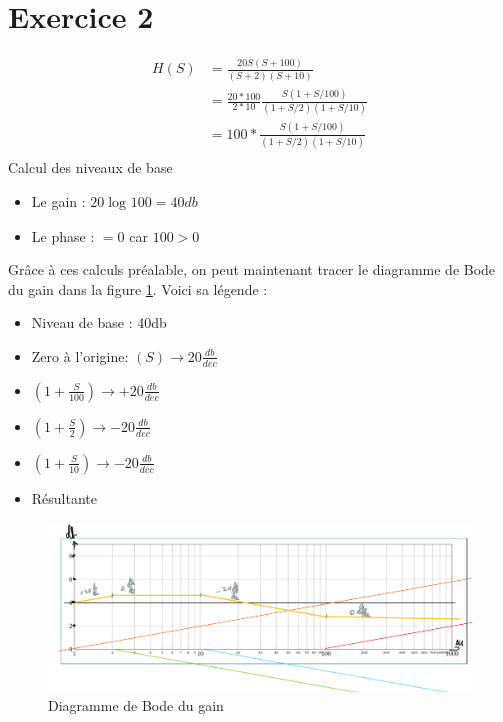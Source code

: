 \documentclass{article}
\theoremstyle{plain}%
\theoremstyle{definition}
\theoremstyle{remark}
\begin{document}
\section{Exercice 2}
\begin{align*}
    H(S) &= \frac{20S(S+100)}{(S+2)(S+10)} \\
        &= \frac{20*100}{2*10} \frac{S(1 + S/100)}{(1+S/2)(1+S/10)} \\
        &= 100 * \frac{S(1 + S/100)}{(1+S/2)(1+S/10)} \\
\end{align*}
Calcul des niveaux de base
\begin{itemize}
    \item Le gain : $ 20 \log_{} 100  = 40db$ 
    \item Le phase : $ = 0 $ car $ 100 > 0 $  
\end{itemize}
Grâce à ces calculs préalable, on peut maintenant tracer le diagramme de Bode du gain dans la figure \ref{BodeGain}. Voici sa légende : \begin{itemize}
    \item \color{black} Niveau de base : 40db \color{orange}
    \item Zero à l'origine: $ (S) \rightarrow 20 \frac{db}{dec}$ \color{red}
    \item $ (1 + \frac{S}{100}) \rightarrow +20 \frac{db}{dec}$ \color{green}
    \item $ (1 + \frac{S}{2}) \rightarrow -20 \frac{db}{dec}$ \color{blue}
    \item $ (1 + \frac{S}{10}) \rightarrow -20 \frac{db}{dec}$ \color{yellow}
    \item Résultante \color{black}
\end{itemize}

\begin{figure}[htbp]
    \centering
    \includegraphics*[width=\textwidth]{./gain.png}
    \caption{Diagramme de Bode du gain}
    \label{BodeGain}
\end{figure}
\end{document}
